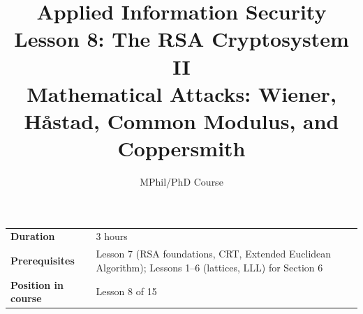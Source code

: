 \documentclass[11pt]{article}
\title{\textbf{Applied Information Security} \\ \Large Lesson 8: The RSA Cryptosystem II \\ \large Mathematical Attacks: Wiener, Håstad, Common Modulus, and Coppersmith}
\author{MPhil/PhD Course}
\date{}
\begin{document}
\maketitle

\begin{center}
\begin{tabular}{ll}
\toprule
\textbf{Duration} & 3 hours \\
\textbf{Prerequisites} & Lesson 7 (RSA foundations, CRT, Extended Euclidean Algorithm); Lessons 1--6 (lattices, LLL) for Section 6 \\
\textbf{Position in course} & Lesson 8 of 15 \\
\bottomrule
\end{tabular}
\end{center}

\tableofcontents
\newpage


\end{document}
